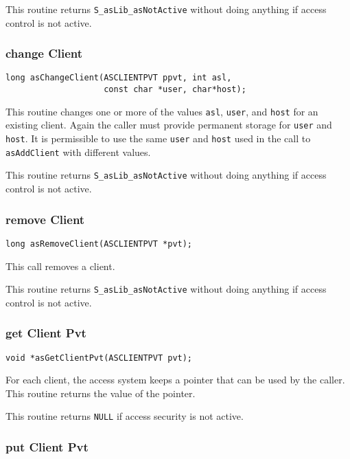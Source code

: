 This routine returns \verb|S_asLib_asNotActive| without doing anything if access control is not active.

\subsubsection{change Client}

\begin{verbatim}
long asChangeClient(ASCLIENTPVT ppvt, int asl,
                    const char *user, char*host);
\end{verbatim}

This routine changes one or more of the values \verb|asl|, \verb|user|, and \verb|host| for an existing client. Again the caller must provide 
permanent storage for \verb|user| and \verb|host|. It is permissible to use the same \verb|user| and \verb|host| used in the call to 
\verb|asAddClient| with different values.

This routine returns \verb|S_asLib_asNotActive| without doing anything if access control is not active.

\subsubsection{remove Client}

\begin{verbatim}
long asRemoveClient(ASCLIENTPVT *pvt);
\end{verbatim}

This call removes a client.

This routine returns \verb|S_asLib_asNotActive| without doing anything if access control is not active.

\subsubsection{get Client Pvt}

\begin{verbatim}
void *asGetClientPvt(ASCLIENTPVT pvt); 
\end{verbatim}

For each client, the access system keeps a pointer that can be used by the caller. This routine returns the value of the 
pointer.

This routine returns \verb|NULL| if access security is not active. 

\subsubsection{put Client Pvt}

